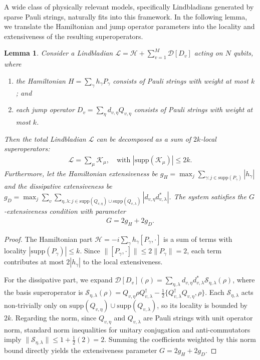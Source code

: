 \documentclass[aps,pra,reprint,groupedaddress,floatfix]{revtex4-2}
\newtheorem{lemma}{Lemma}
\newcommand{\supp}{\mathrm{supp}}
\begin{document}
A wide class of physically relevant models, specifically Lindbladians generated by sparse Pauli strings, naturally fits into this framework. In the following lemma, we translate the Hamiltonian and jump operator parameters into the locality and extensiveness of the resulting superoperators.

\begin{lemma}
\label{lem:lindblad-mapping}
    Consider a Lindbladian $\mathcal{L} = \mathcal{H} + \sum_{v=1}^M \mathcal{D}[D_v]$ acting on $N$ qubits, where
    \begin{enumerate}
        \item the Hamiltonian $H = \sum_{\gamma} h_\gamma P_\gamma$ consists of Pauli strings with weight at most $k$; and 
        \item each jump operator $D_v = \sum_{\eta} d_{v,\eta} Q_{v,\eta}$ consists of Pauli strings with weight at most $k$.
    \end{enumerate}
    Then the total Lindbladian $\mathcal{L}$ can be decomposed as a sum of \emph{$2k$-local superoperators}:
    \begin{align*}
        \mathcal{L} = \sum_{\mu} \mathcal{K}_\mu, \quad \text{with } |\supp(\mathcal{K}_\mu)| \le 2k.
    \end{align*}
    Furthermore, let the Hamiltonian extensiveness be $g_H = \max_j \sum_{\gamma: j \in \supp(P_\gamma)} |h_\gamma|$ and the dissipative extensiveness be $g_D = \max_j \sum_{v} \sum_{\eta, \lambda: j \in \supp(Q_{v,\eta}) \cup \supp(Q_{v,\lambda})} |d_{v,\eta} d_{v,\lambda}^*|$.
    The system satisfies the \emph{$G$-extensiveness} condition with parameter
    \begin{align*}
        G = 2 g_H + 2 g_D.
    \end{align*}
\end{lemma}
\begin{proof}
    The Hamiltonian part $\mathcal{H} = -i \sum_\gamma h_\gamma [P_\gamma, \cdot]$ is a sum of terms with locality $|\supp(P_\gamma)| \le k$. Since $\|[P_\gamma, \cdot]\| \le 2\|P_\gamma\| = 2$, each term contributes at most $2|h_\gamma|$ to the local extensiveness.
    
    For the dissipative part, we expand $\mathcal{D}[D_v](\rho) = \sum_{\eta,\lambda} d_{v,\eta}d_{v,\lambda}^* \mathcal{S}_{\eta,\lambda}(\rho)$, where the basis superoperator is $\mathcal{S}_{\eta,\lambda}(\rho) = Q_{v,\eta}\rho Q_{v,\lambda}^\dagger - \frac{1}{2}\{Q_{v,\lambda}^\dagger Q_{v,\eta}, \rho\}$. 
    Each $\mathcal{S}_{\eta,\lambda}$ acts non-trivially only on $\supp(Q_{v,\eta}) \cup \supp(Q_{v,\lambda})$, so its locality is bounded by $2k$.
    Regarding the norm, since $Q_{v,\eta}$ and $Q_{v,\lambda}$ are Pauli strings with unit operator norm, standard norm inequalities for unitary conjugation and anti-commutators imply $\|\mathcal{S}_{\eta,\lambda}\|\le 1 + \frac{1}{2}(2) = 2$.
    Summing the coefficients weighted by this norm bound directly yields the extensiveness parameter $G = 2g_H + 2g_D$.
\end{proof}
\end{document}
